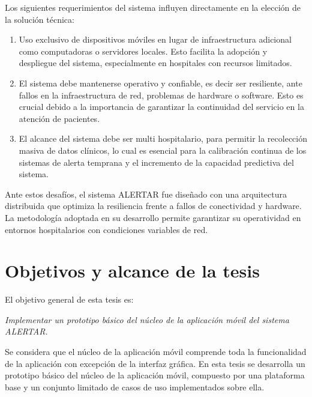 Los siguientes requerimientos del sistema influyen directamente en la elección de la solución técnica: 
\begin{enumerate}
    \item Uso exclusivo de dispositivos móviles en lugar de infraestructura adicional como computadoras o servidores locales. Esto facilita la adopción y despliegue del sistema, especialmente en hospitales con recursos limitados.
    \item El sistema debe mantenerse operativo y confiable, es decir ser resiliente, ante fallos en la infraestructura de red, problemas de hardware o software. Esto es crucial debido a la importancia de garantizar la continuidad del servicio en la atención de pacientes.
    \item El alcance del sistema debe ser multi hospitalario, para permitir la recolección masiva de datos clínicos, lo cual es esencial para la calibración continua de los sistemas de alerta temprana y el incremento de la capacidad predictiva del sistema.
\end{enumerate}

Ante estos desafíos, el sistema ALERTAR fue diseñado con una arquitectura distribuida que optimiza la resiliencia frente a fallos de conectividad y hardware. La metodología adoptada en su desarrollo permite garantizar su operatividad en entornos hospitalarios con condiciones variables de red.


\section{Objetivos y alcance de la tesis}
El objetivo general de esta tesis es:

\begin{center}
    \textit{Implementar un prototipo básico del núcleo de la aplicación móvil del sistema ALERTAR.} 
\end{center}

Se considera que el núcleo de la aplicación móvil comprende toda la funcionalidad de la aplicación con excepción de la interfaz gráfica. En esta tesis se desarrolla un prototipo básico del núcleo de la aplicación móvil, compuesto por una plataforma base y un conjunto limitado de casos de uso implementados sobre ella.

